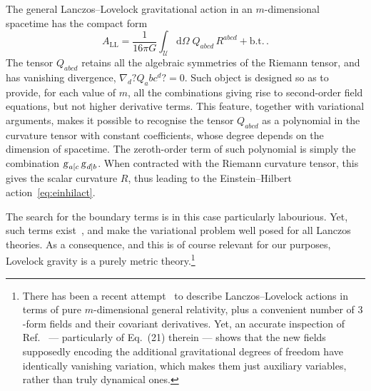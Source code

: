 \documentclass[a4paper,showkeys,aps,prd,reprint,nofootinbib,showpacs,twocolumn]{revtex4-1}
\newcommand{\de}{\mathrm{d}}
\newcommand{\eq}[1]{\( #1 \)}
\newcommand{\eqd}[1]{\begin{equation} #1 \end{equation}}
\newcommand{\matg}{\text{\textsl{g}}}%
\theoremstyle{plain}
\begin{document}
The general Lanczos--Lovelock gravitational action in an \eq{m}-dimensional spacetime has the compact form~\cite{Padmanabhan:2010zzb}
%
\eqd{A_{\text{LL}} =\frac{1}{16\pi G}  \int_{\mathscr{U}} \de \Omega \;  Q_{abcd}\, R^{abcd} + \text{b.t.} \,. \label{eq:GB-action}}
%
The tensor \eq{Q_{abcd}} retains all the algebraic symmetries of the Riemann tensor, and has vanishing divergence, \eq{\nabla_{\! d} ?Q_abc^d? = 0}.  Such object is designed so as to provide, for each value of \eq{m}, all the combinations giving rise to second-order field equations, but not higher derivative terms. This feature, together with variational arguments, makes it possible to recognise the tensor \eq{Q_{abcd}} as a polynomial in the curvature tensor with constant coefficients, whose degree depends on the dimension of spacetime.  The zeroth-order term of such polynomial is simply the combination \eq{\matg_{a [ c}\, \matg_{d ] b}}.  When contracted with the Riemann curvature tensor, this gives the scalar curvature \eq{R}, thus leading to the Einstein--Hilbert action~\eqref{eq:einhilact}.

The search for the boundary terms is in this case particularly labourious.  Yet, such terms exist~\cite{bunch, Sendouda:2011hq, Myers:1987yn, Mukhopadhyay:2006vu}, and make the variational problem well posed for all Lanczos theories.  As a consequence, and this is of course relevant for our purposes, Lovelock gravity is a purely metric theory.\footnote{There has been a recent attempt~\cite{Brustein:2012uu} to describe Lanczos--Lovelock actions in terms of pure \eq{m}-dimensional general relativity, plus a convenient number of \eq{3}-form fields and their covariant derivatives.  Yet, an accurate inspection of Ref.~\cite{Brustein:2012uu} --- particularly of Eq.~(21) therein --- shows that the new fields supposedly encoding the additional gravitational degrees of freedom have identically vanishing variation, which makes them just auxiliary variables, rather than truly dynamical ones.} 
\end{document}
